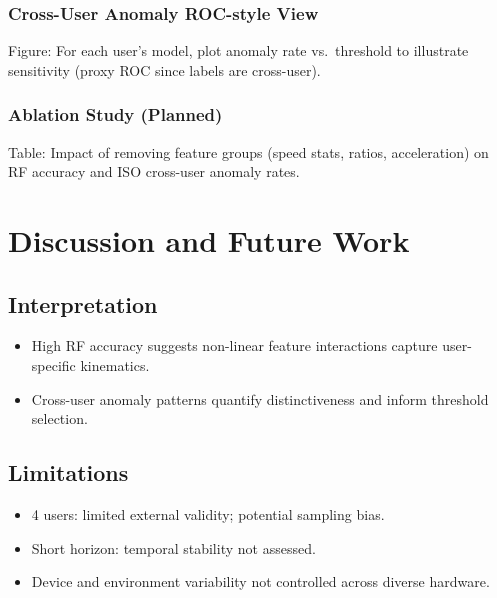 \documentclass[
  11pt,
  a4paper,
]{article}
\providecommand{\tightlist}{%
  \setlength{\itemsep}{0pt}\setlength{\parskip}{0pt}}
\begin{document}
\subsubsection{Cross-User Anomaly ROC-style
View}\label{cross-user-anomaly-roc-style-view}

Figure: For each user's model, plot anomaly rate vs.~threshold to
illustrate sensitivity (proxy ROC since labels are cross-user).

\subsubsection{Ablation Study (Planned)}\label{ablation-study-planned}

Table: Impact of removing feature groups (speed stats, ratios,
acceleration) on RF accuracy and ISO cross-user anomaly rates.

\section{Discussion and Future Work}\label{discussion-and-future-work}

\subsection{Interpretation}\label{interpretation}

\begin{itemize}
\tightlist
\item
  High RF accuracy suggests non-linear feature interactions capture
  user-specific kinematics.
\item
  Cross-user anomaly patterns quantify distinctiveness and inform
  threshold selection.
\end{itemize}

\subsection{Limitations}\label{limitations}

\begin{itemize}
\tightlist
\item
  4 users: limited external validity; potential sampling bias.
\item
  Short horizon: temporal stability not assessed.
\item
  Device and environment variability not controlled across diverse
  hardware.
\end{itemize}
\end{document}

